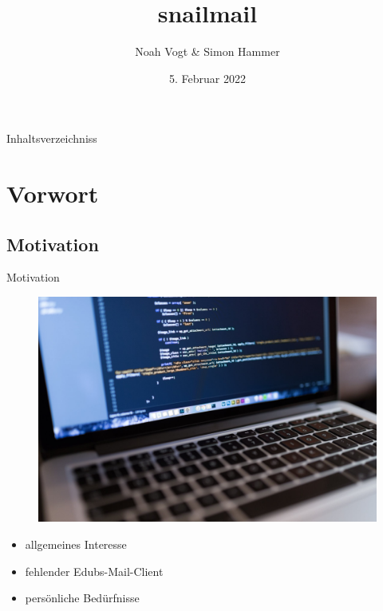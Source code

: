 \documentclass[aspectratio=169]{beamer}
\title{snailmail}
\author{Noah Vogt \& Simon Hammer}
\date{5. Februar 2022}
\institute{Gymnasium Kirschgarten}
\newlength\myheight
\newlength\mydepth
\newcommand*\inlinegraphics[1]{
    \settototalheight\myheight{Xygp}
    \settodepth\mydepth{Xygp}
    \raisebox{-\mydepth}{\texttt{[image: \#1]}}%
}
\begin{document}
\begin{frame}[plain]

\maketitle

\end{frame}

\begin{frame}[plain]{Inhaltsverzeichniss}
    \tableofcontents
\end{frame}

\section{Vorwort}
\subsection{Motivation}
\begin{frame}[plain]{Motivation}
\begin{varwidth}{.5\textwidth}
        \begin{figure}
            \centering
            \includegraphics[width=.9\textwidth]{media/macbook.jpg}
        \end{figure}
    \end{varwidth}
    \hfill
    \begin{varwidth}{.5\textwidth}
        \begin{itemize}\pause
            \item allgemeines Interesse\pause
            \item fehlender Edubs-Mail-Client\pause
            \item persönliche Bedürfnisse
        \end{itemize}
    \end{varwidth} 
\end{frame}
\end{document}

